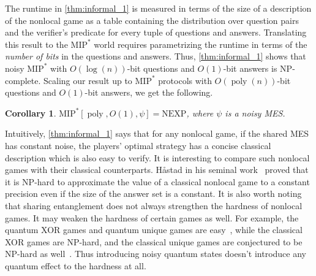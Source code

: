 \documentclass[11pt]{article}
\theoremstyle{plain}
\newtheorem{cor}[theorem]{Corollary}
\theoremstyle{definition}
\newcommand{\poly} {\ensuremath{\operatorname{poly}}}
\newcommand{\1}{\mathbb{1}} %
\newcommand{\MIP}{\mathrm{MIP}}
\begin{document}
The runtime in \cref{thm:informal_1} is measured in terms of the size of a description of the nonlocal game as a table containing the distribution over question pairs and the verifier's predicate for every tuple of questions and answers. Translating this result to the $\MIP^*$ world requires parametrizing the runtime in terms of the \emph{number of bits} in the questions and answers. Thus, \cref{thm:informal_1} shows that noisy $\MIP^*$ with $O(\log(n))$-bit questions and $O(1)$-bit answers is $\mathrm{NP}$-complete.
Scaling our result up to $\MIP^\ast$ protocols with $O(\poly(n))$-bit questions and $O(1)$-bit answers, we get the following.
\begin{cor}
    $\MIP^\ast[\poly, O(1),\psi]=\mathrm{NEXP}$, where $\psi$ is a noisy MES.
\end{cor}
Intuitively, \cref{thm:informal_1} says that for any nonlocal game, if the shared MES has constant noise, the players' optimal strategy has a concise classical description which is also easy to verify. 
It is interesting to compare such nonlocal games with their classical counterparts. H\aa stad in his seminal work~\cite{hastad} proved that it is $\mathrm{NP}$-hard to approximate the value of a classical nonlocal game to a constant precision even if the size of the answer set is a constant.  It is also worth noting that sharing entanglement does not always strengthen the hardness of nonlocal games. It may weaken the hardness of certain games as well. For example, the quantum XOR games and quantum unique games are easy~\cite{1313847,doi:10.1137/090772885}, while the classical XOR games are $\mathrm{NP}$-hard, and the classical unique games are conjectured to be $\mathrm{NP}$-hard as well~\cite{10.1145/509907.510017}. 
Thus introducing noisy quantum states doesn't introduce any quantum effect to the hardness at all.
\end{document}
